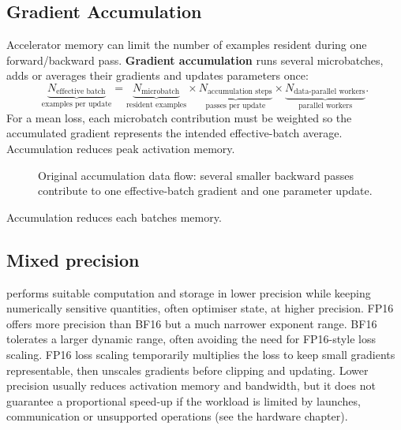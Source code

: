 \subsection{Gradient Accumulation}
\label{sec:optimisation-gradient-accumulation-and-mixed-precision}
Accelerator memory can limit the number of examples resident during one forward/backward pass.
\textbf{Gradient accumulation} runs several microbatches, adds or averages their gradients and updates parameters once:
\[
\underbrace{N_{\text{effective batch}}}_{\text{examples per update}}
=
\underbrace{N_{\text{microbatch}}}_{\text{resident examples}}
\times
\underbrace{N_{\text{accumulation steps}}}_{\text{passes per update}}
\times
\underbrace{N_{\text{data-parallel workers}}}_{\text{parallel workers}}.
\]
For a mean loss, each microbatch contribution must be weighted so the accumulated gradient represents the intended effective-batch average.
Accumulation reduces peak activation memory.

\begin{figure}[htbp]
\centering
{}
\caption{Original accumulation data flow: several smaller backward passes contribute to one effective-batch gradient and one parameter update.}
\end{figure}
\begin{calloutmemoryhook}
Accumulation reduces each batches memory.
\end{calloutmemoryhook}

\subsection{Mixed precision} performs suitable computation and storage in lower precision while keeping numerically sensitive quantities, often optimiser state, at higher precision.
FP16 offers more precision than BF16 but a much narrower exponent range.
BF16 tolerates a larger dynamic range, often avoiding the need for FP16-style loss scaling.
FP16 loss scaling temporarily multiplies the loss to keep small gradients representable, then unscales gradients before clipping and updating.
Lower precision usually reduces activation memory and bandwidth, but it does not guarantee a proportional speed-up if the workload is limited by launches, communication or unsupported operations (see the hardware chapter).

